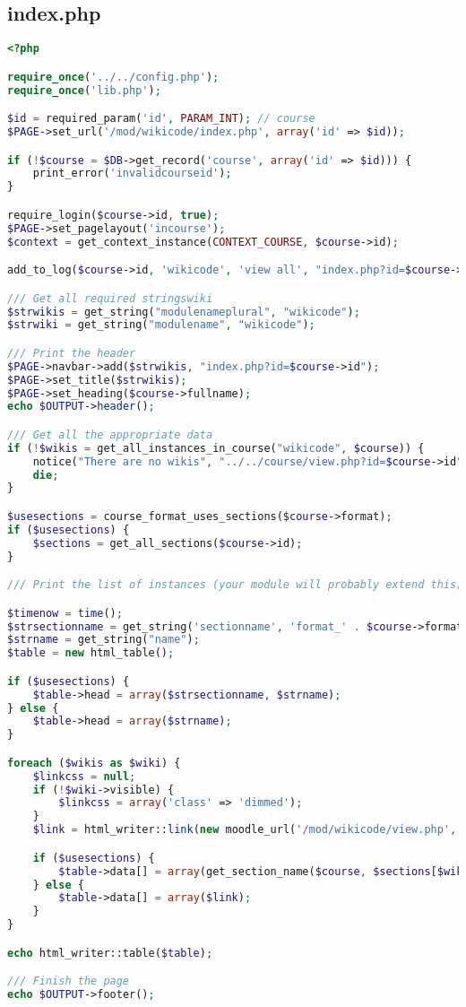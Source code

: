 \subsection{index.php}
\begin{lstlisting}[language=PHP]
<?php

require_once('../../config.php');
require_once('lib.php');

$id = required_param('id', PARAM_INT); // course
$PAGE->set_url('/mod/wikicode/index.php', array('id' => $id));

if (!$course = $DB->get_record('course', array('id' => $id))) {
    print_error('invalidcourseid');
}

require_login($course->id, true);
$PAGE->set_pagelayout('incourse');
$context = get_context_instance(CONTEXT_COURSE, $course->id);

add_to_log($course->id, 'wikicode', 'view all', "index.php?id=$course->id", "");

/// Get all required stringswiki
$strwikis = get_string("modulenameplural", "wikicode");
$strwiki = get_string("modulename", "wikicode");

/// Print the header
$PAGE->navbar->add($strwikis, "index.php?id=$course->id");
$PAGE->set_title($strwikis);
$PAGE->set_heading($course->fullname);
echo $OUTPUT->header();

/// Get all the appropriate data
if (!$wikis = get_all_instances_in_course("wikicode", $course)) {
    notice("There are no wikis", "../../course/view.php?id=$course->id");
    die;
}

$usesections = course_format_uses_sections($course->format);
if ($usesections) {
    $sections = get_all_sections($course->id);
}

/// Print the list of instances (your module will probably extend this)

$timenow = time();
$strsectionname = get_string('sectionname', 'format_' . $course->format);
$strname = get_string("name");
$table = new html_table();

if ($usesections) {
    $table->head = array($strsectionname, $strname);
} else {
    $table->head = array($strname);
}

foreach ($wikis as $wiki) {
    $linkcss = null;
    if (!$wiki->visible) {
        $linkcss = array('class' => 'dimmed');
    }
    $link = html_writer::link(new moodle_url('/mod/wikicode/view.php', array('id' => $wiki->coursemodule)), $wiki->name, $linkcss);

    if ($usesections) {
        $table->data[] = array(get_section_name($course, $sections[$wiki->section]), $link);
    } else {
        $table->data[] = array($link);
    }
}

echo html_writer::table($table);

/// Finish the page
echo $OUTPUT->footer();
\end{lstlisting}

